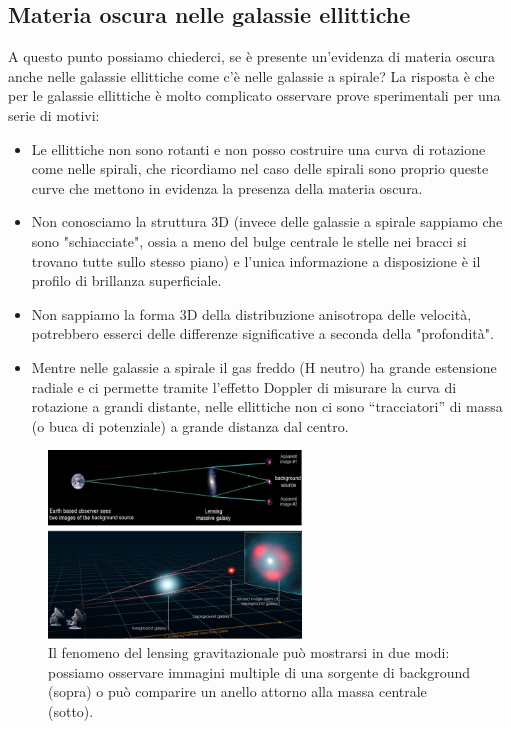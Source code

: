 \subsection{Materia oscura nelle galassie ellittiche}
A questo punto possiamo chiederci, se è presente un'evidenza di materia oscura anche nelle galassie ellittiche come c’è nelle galassie a spirale? La risposta è che per le galassie ellittiche è molto complicato osservare prove sperimentali per una serie di motivi:
\begin{itemize}
    \item Le ellittiche non sono rotanti e non posso costruire una curva di rotazione come nelle spirali, che ricordiamo nel caso delle spirali sono proprio queste curve che mettono in evidenza la presenza della materia oscura.
    \item Non conosciamo la struttura 3D (invece delle galassie a spirale sappiamo che sono "schiacciate", ossia a meno del bulge centrale le stelle nei bracci si trovano tutte sullo stesso piano) e l’unica informazione a disposizione è il profilo di brillanza superficiale.
    \item Non sappiamo la forma 3D della distribuzione anisotropa delle velocità, potrebbero esserci delle differenze significative a seconda della "profondità".
    \item Mentre nelle galassie a spirale il gas freddo (H neutro) ha grande estensione radiale e ci permette tramite l'effetto Doppler di misurare la curva di rotazione a grandi distante, nelle ellittiche non ci sono “tracciatori” di massa (o buca di potenziale) a grande distanza dal centro.
\end{itemize} 

\begin{figure}
    \centering
    \includegraphics[width=0.6\textwidth]{immagini/gravitational-lensing.png}
    \caption{Il fenomeno del lensing gravitazionale può mostrarsi in due modi: possiamo osservare immagini multiple di una sorgente di background (sopra) o può comparire un anello attorno alla massa centrale (sotto).}
    \label{fig:gravitational-lensing}
\end{figure}

